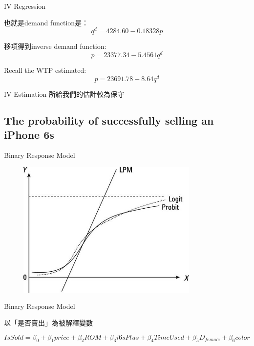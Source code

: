 \documentclass[11pt]{beamer}
\begin{document}
\begin{frame}[fragile]{IV Regression}

也就是demand function是：
$$q^d = 4284.60 - 0.18328 p$$

移項得到inverse demand function:
$$p = 23377.34 -5.4561 q^d$$

Recall the WTP estimated:
$$p = 23691.78 -8.64 q^d$$

IV Estimation 所給我們的估計較為保守
\end{frame}


\subsection{The probability of successfully selling an iPhone 6s}

\begin{frame}[fragile]{Binary Response Model}

	\begin{figure}
		\begin{center}
			\includegraphics[width=0.8\textwidth]{figure/f08.png}
		\end{center}
	\end{figure}

\end{frame}


\begin{frame}[fragile]{Binary Response Model}

以「是否賣出」為被解釋變數

$$IsSold = \beta_0 + \beta_1 price + \beta_2 ROM + \beta_3 i6sPlus+ \beta_4 TimeUsed+ \beta_5 D_{female}+ \beta_6 color $$

\end{frame}
\end{document}

